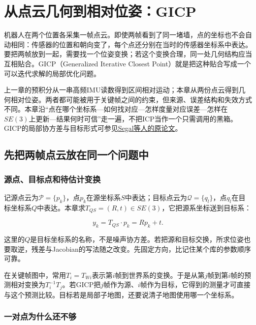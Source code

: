 \chapter{从点云几何到相对位姿：GICP}

\label{chap:md-11}

机器人在两个位置各采集一帧点云。即使两帧看到了同一堵墙，点的坐标也不会自动相同：传感器的位置和朝向变了，每个点还分别在当时的传感器坐标系中表达。要把两帧放到一起，需要找一个位姿变换；若这个变换合理，同一处几何结构应当互相贴合。GICP（Generalized Iterative Closest Point）就是把这种贴合写成一个可以迭代求解的局部优化问题。

上一章的预积分从一串高频IMU读数得到区间相对运动；本章从两份点云得到几何相对位姿。两者都可能被用于关键帧之间的约束，但来源、误差结构和失效方式不同。本章沿“点在哪个坐标系—如何找对应—怎样度量对应误差—怎样在$SE(3)$上更新—结果何时可信”走一遍，不把ICP当作一个只需调用的黑箱。GICP的局部协方差与目标形式可参见\href{https://www.roboticsproceedings.org/rss05/p21.html}{Segal等人的原论文}。

\section{先把两帧点云放在同一个问题中}

\subsection{源点、目标点和待估计变换}

记源点云为$\mathcal P=\{p_k\}$，点$p_k$在源坐标系$S$中表达；目标点云为$\mathcal Q=\{q_l\}$，点$q_l$在目标坐标系$Q$中表达。本章求$T_{QS}=(R,t)\in SE(3)$，它把源系坐标送到目标系：

\begin{equation*}
y_k=T_{QS}\cdot p_k=Rp_k+t.
\end{equation*}

这里的$Q$是目标坐标系的名称，不是噪声协方差。若把源和目标交换，所求位姿也要取逆，残差与Jacobian的写法随之改变。先固定方向，比记住某个库的参数顺序可靠。

在关键帧图中，常用$T_i=T_{Wi}$表示第$i$帧到世界系的变换。于是从第$j$帧到第$i$帧的预测相对变换为$T_i^{-1}T_j$。若GICP把$j$帧作为源、$i$帧作为目标，它得到的测量才可直接与这个预测比较。目标若是局部子地图，还要说清子地图使用哪一个坐标系。

\subsection{一对点为什么还不够}

